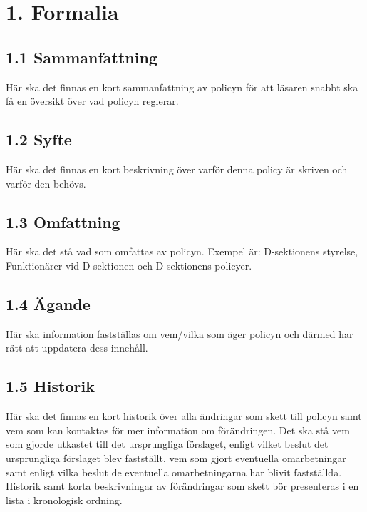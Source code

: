 \documentclass[]{dsekkallelse}
\begin{document}
\hfill\begin{minipage}{\dimexpr\textwidth-3cm}
    \xdef\tpd{\the\prevdepth}
    \section{1. Formalia}
    \subsection{1.1 Sammanfattning}
    Här ska det finnas en kort sammanfattning av policyn för att läsaren snabbt ska få en översikt över vad policyn reglerar. \\

    \subsection{1.2 Syfte}
    Här ska det finnas en kort beskrivning över varför denna policy är skriven och varför den behövs. \\

    \subsection{1.3 Omfattning}
    Här ska det stå vad som omfattas av policyn. Exempel är: D-sektionens styrelse, Funktionärer vid D-sektionen och D-sektionens policyer.\\

    \subsection{1.4 Ägande}
    Här ska information fastställas om vem/vilka som äger policyn och därmed har rätt att uppdatera dess innehåll. \\

    \subsection{1.5 Historik}
    Här ska det finnas en kort historik över alla ändringar som skett till policyn samt vem som kan kontaktas för mer information om förändringen. Det ska stå vem som gjorde utkastet till det ursprungliga förslaget, enligt vilket beslut det ursprungliga förslaget blev fastställt, vem som gjort eventuella omarbetningar samt enligt vilka beslut de eventuella omarbetningarna har blivit fastställda.
    \\

    Historik samt korta beskrivningar av förändringar som skett bör presenteras i en lista i kronologisk ordning. \\
\end{minipage}
\end{document}
